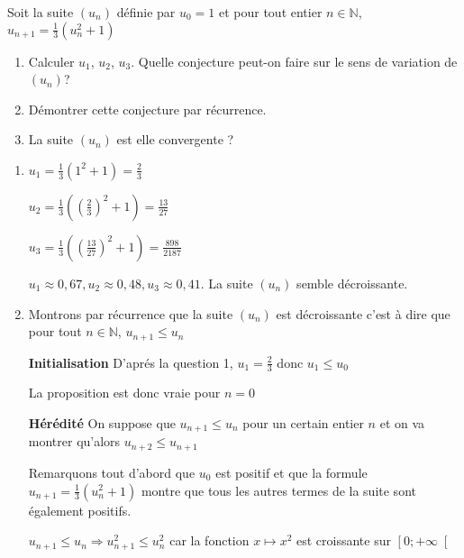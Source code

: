 
%
Soit la suite $\left(u_{n}\right)$ définie par $u_{0}=1$ et pour tout entier $n \in  \mathbb{N}$, $u_{n+1}=\frac{1}{3}\left(u_{n}^{2}+1\right)$
\begin{enumerate}
     \item
     Calculer $u_{1}$, $u_{2}$, $u_{3}$. Quelle conjecture peut-on faire sur le sens de variation de $\left(u_{n}\right)$?
     \item
     Démontrer cette conjecture par récurrence.
     \item
     La suite $\left(u_{n}\right)$ est elle convergente ?
\end{enumerate}
\begin{corrige}
     \begin{enumerate}
          \item
          $u_{1}=\frac{1}{3}\left(1^{2}+1\right)=\frac{2}{3}$
          \par
          $u_{2}=\frac{1}{3}\left(\left(\frac{2}{3}\right)^{2}+1\right)=\frac{13}{27}$
          \par
          $u_{3}=\frac{1}{3}\left(\left(\frac{13}{27}\right)^{2}+1\right)=\frac{898}{2187}$
          \par
          $u_{1}\approx 0,67,  u_{2}\approx 0,48,  u_{3}\approx 0,41$. La suite $\left(u_{n}\right)$ semble décroissante.
          \item
          Montrons par récurrence que la suite $\left(u_{n}\right)$ est décroissante c'est à dire que pour tout $n \in  \mathbb{N}$, $u_{n+1}\leqslant u_{n}$
\par
          \textbf{Initialisation}
          D'aprés la question 1, $u_{1}=\frac{2}{3}$ donc $u_{1}\leqslant u_{0}$
          \par
          La proposition est donc vraie pour $n=0$
\par
          \textbf{Hérédité}
          On suppose que $u_{n+1}\leqslant u_{n}$ pour un certain entier $n$ et on va montrer qu'alors $u_{n+2} \leqslant  u_{n+1}$
          \par
          Remarquons tout d'abord que $u_{0}$ est positif et que la formule $u_{n+1}=\frac{1}{3}\left(u_{n}^{2}+1\right)$ montre que tous les autres termes de la suite sont également positifs.
          \par
          $u_{n+1} \leqslant  u_{n} \Rightarrow  u_{n+1}^{2} \leqslant  u_{n}^{2} $ car la fonction $x\mapsto x^{2}$ est croissante sur $\left[0;+\infty \right[$

\end{enumerate}
\end{corrige}

